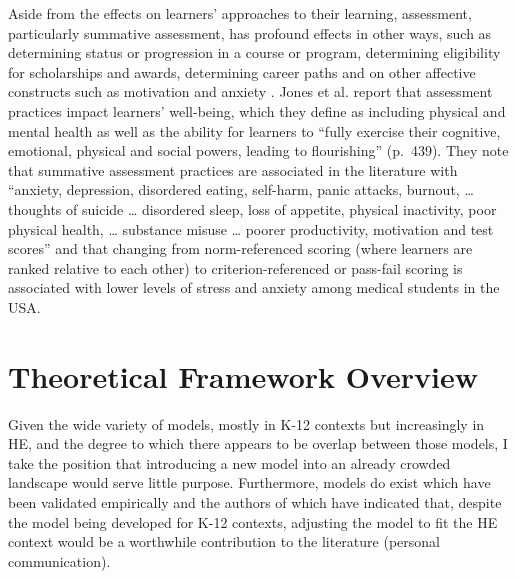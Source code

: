 \documentclass[
]{book}
\begin{document}
Aside from the effects on learners' approaches to their learning, assessment, particularly summative assessment, has profound effects in other ways, such as determining status or progression in a course or program, determining eligibility for scholarships and awards, determining career paths and on other affective constructs such as motivation \citep{crooksImpactClassroomEvaluation1988} and anxiety \citep{birenbaumAssessmentInstructionPreferences2007, harlenSystematicReviewImpact2002}. Jones et al. \citeyearpar{jonesStudentWellbeingAssessment2021} report that assessment practices impact learners' well-being, which they define as including physical and mental health as well as the ability for learners to ``fully exercise their cognitive, emotional, physical and social powers, leading to flourishing'' (p.~439). They note that summative assessment practices are associated in the literature with ``anxiety, depression, disordered eating, self-harm, panic attacks, burnout, \ldots{} thoughts of suicide \ldots{} disordered sleep, loss of appetite, physical inactivity, poor physical health, \ldots{} substance misuse \ldots{} poorer productivity, motivation and test scores'' and that changing from norm-referenced scoring (where learners are ranked relative to each other) to criterion-referenced or pass-fail scoring is associated with lower levels of stress and anxiety among medical students in the USA.

\hypertarget{theoretical-framework-overview}{%
\section{Theoretical Framework Overview}\label{theoretical-framework-overview}}

Given the wide variety of models, mostly in K-12 contexts but increasingly in HE, and the degree to which there appears to be overlap between those models, I take the position that introducing a new model into an already crowded landscape would serve little purpose. Furthermore, models do exist which have been validated empirically \citep{delucaApproachesClassroomAssessment2016} and the authors of which have indicated that, despite the model being developed for K-12 contexts, adjusting the model to fit the HE context would be a worthwhile contribution to the literature (personal communication).
\end{document}
